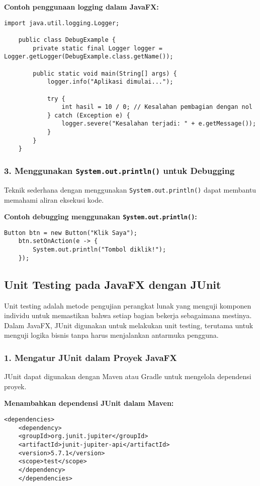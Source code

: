 \textbf{Contoh penggunaan logging dalam JavaFX:}
\begin{lstlisting}[style=JavaStyle, caption=Menggunakan logging dalam JavaFX]
	import java.util.logging.Logger;
	
	public class DebugExample {
		private static final Logger logger = Logger.getLogger(DebugExample.class.getName());
		
		public static void main(String[] args) {
			logger.info("Aplikasi dimulai...");
			
			try {
				int hasil = 10 / 0; // Kesalahan pembagian dengan nol
			} catch (Exception e) {
				logger.severe("Kesalahan terjadi: " + e.getMessage());
			}
		}
	}
\end{lstlisting}

\subsubsection{3. Menggunakan \texttt{System.out.println()} untuk Debugging}

Teknik sederhana dengan menggunakan \texttt{System.out.println()} dapat membantu memahami aliran eksekusi kode.

\textbf{Contoh debugging menggunakan \texttt{System.out.println()}:}
\begin{lstlisting}[style=JavaStyle, caption=Menampilkan nilai variabel dalam console]
	Button btn = new Button("Klik Saya");
	btn.setOnAction(e -> {
		System.out.println("Tombol diklik!");
	});
\end{lstlisting}

\subsection{Unit Testing pada JavaFX dengan JUnit}

Unit testing adalah metode pengujian perangkat lunak yang menguji komponen individu untuk memastikan bahwa setiap bagian bekerja sebagaimana mestinya. Dalam JavaFX, JUnit digunakan untuk melakukan unit testing, terutama untuk menguji logika bisnis tanpa harus menjalankan antarmuka pengguna.

\subsubsection{1. Mengatur JUnit dalam Proyek JavaFX}

JUnit dapat digunakan dengan Maven atau Gradle untuk mengelola dependensi proyek.

\textbf{Menambahkan dependensi JUnit dalam Maven:}
\begin{lstlisting}[style=XmlStyle, caption=Menambahkan dependensi JUnit dalam Maven]
	<dependencies>
	<dependency>
	<groupId>org.junit.jupiter</groupId>
	<artifactId>junit-jupiter-api</artifactId>
	<version>5.7.1</version>
	<scope>test</scope>
	</dependency>
	</dependencies>
\end{lstlisting}

